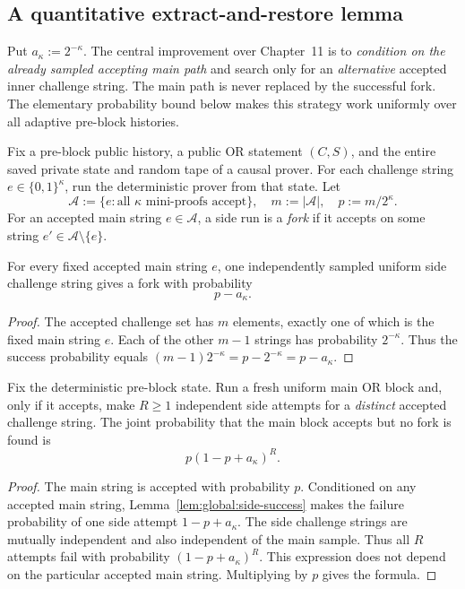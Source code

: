 \subsection{A quantitative extract-and-restore lemma}\label{sec:global:fork}
Put $a_\kappa:=2^{-\kappa}$.
The central improvement over Chapter~11 is to
\emph{condition on the already sampled accepting
main path} and search only for an \emph{alternative}
accepted inner challenge string. The main path is
never replaced by the successful fork.
The elementary probability bound below makes
this strategy work uniformly over all adaptive
pre-block histories.

\begin{definition}\label{def:global:tree}
Fix a pre-block public history, a public OR
statement $(C,S)$, and the entire saved private
state and random tape of a causal prover.
For each challenge string
$e\in\{0,1\}^{\kappa}$,
run the deterministic prover from that state.
Let
\[
 \mathcal A:=\{e:\text{all }\kappa
 \text{ mini-proofs accept}\},\quad
 m:=|\mathcal A|,\quad
 p:=m/2^\kappa.
\]
For an accepted main string $e\in\mathcal A$,
a side run is a \emph{fork} if it accepts on
some string $e'\in\mathcal A\setminus\{e\}$.
\end{definition}

\begin{lemma}\label{lem:global:side-success}
For every fixed accepted main string $e$,
one independently sampled uniform side
challenge string gives a fork with probability
\[
 \boxed{p-a_\kappa}.
\]
\end{lemma}
\begin{proof}
The accepted challenge set has $m$ elements,
exactly one of which is the fixed main
string $e$. Each of the other $m-1$
strings has probability $2^{-\kappa}$.
Thus the success probability equals
$(m-1)2^{-\kappa}
=p-2^{-\kappa}=p-a_\kappa$.
\end{proof}

\begin{lemma}\label{lem:global:exact-fail}
Fix the deterministic pre-block state.
Run a fresh uniform main OR block and,
only if it accepts, make $R\ge1$ independent
side attempts for a \emph{distinct}
accepted challenge string.
The joint probability that the main block
accepts but no fork is found is
\[
 \boxed{p(1-p+a_\kappa)^R.}
\]
\end{lemma}
\begin{proof}
The main string is accepted with
probability $p$.
Conditioned on any accepted main
string, Lemma~\ref{lem:global:side-success}
makes the failure probability of one
side attempt $1-p+a_\kappa$.
The side challenge strings are mutually
independent and also independent of the
main sample. Thus all $R$ attempts
fail with probability
$(1-p+a_\kappa)^R$.
This expression does not depend on
the particular accepted main string.
Multiplying by $p$ gives the formula.
\end{proof}

